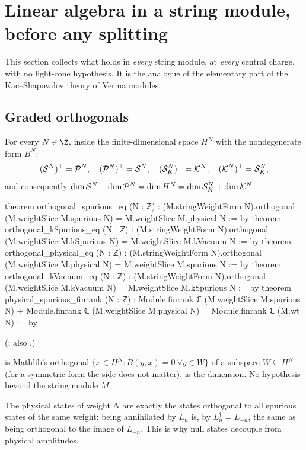 \section{Linear algebra in a string module, before any splitting}\label{ch18:sec:linalg}

This section collects what holds in \emph{every} string module, at \emph{every} central charge, with no
light-cone hypothesis.  It is the analogue of the elementary part of the Kac--Shapovalov theory of
Verma modules.

\subsection{Graded orthogonals}

\begin{theorem}\label{ch18:thm:orthogonals}
For every $N\in\Z$, inside the finite-dimensional space $H^N$ with the nondegenerate form $B^N$:
\begin{equation*}
  (\mathcal{S}^N)^{\perp}=\mathcal{P}^N,\quad (\mathcal{P}^N)^{\perp}=\mathcal{S}^N,\quad
  (\mathcal{S}_K^N)^{\perp}=\mathcal{K}^N,\quad (\mathcal{K}^N)^{\perp}=\mathcal{S}_K^N,
\end{equation*}
and consequently $\dim\mathcal{S}^N+\dim\mathcal{P}^N=\dim H^N=\dim\mathcal{S}_K^N+\dim\mathcal{K}^N$.
\end{theorem}
\begin{leancode}
theorem orthogonal_spurious_eq (N : ℤ) :
    (M.stringWeightForm N).orthogonal (M.weightSlice M.spurious N) =
      M.weightSlice M.physical N := by
theorem orthogonal_kSpurious_eq (N : ℤ) :
    (M.stringWeightForm N).orthogonal (M.weightSlice M.kSpurious N) =
      M.weightSlice M.kVacuum N := by
theorem orthogonal_physical_eq (N : ℤ) :
    (M.stringWeightForm N).orthogonal (M.weightSlice M.physical N) =
      M.weightSlice M.spurious N := by
theorem orthogonal_kVacuum_eq (N : ℤ) :
    (M.stringWeightForm N).orthogonal (M.weightSlice M.kVacuum N) =
      M.weightSlice M.kSpurious N := by
theorem physical_spurious_finrank (N : ℤ) :
    Module.finrank ℂ (M.weightSlice M.spurious N) +
      Module.finrank ℂ (M.weightSlice M.physical N) = Module.finrank ℂ (M.wt N) := by
\end{leancode}
(; also .)

\begin{dictionary}
 is Mathlib's orthogonal $\{x\in H^N: B(y,x)=0\ \forall
y\in W\}$ of a subspace $W\subseteq H^N$ (for a symmetric form the side does not matter).
 is the dimension.  No hypothesis beyond the string module $M$.
\end{dictionary}
\begin{physics}
The physical states of weight $N$ are exactly the states orthogonal to all spurious states of the same
weight: being annihilated by $L_n$ is, by $L_n^\dagger=L_{-n}$, the same as being orthogonal to the image of
$L_{-n}$.  This is why null states decouple from physical amplitudes.
\end{physics}

